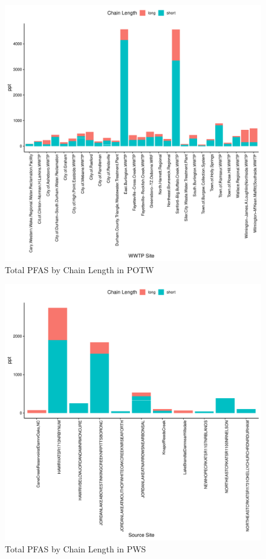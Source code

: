 \documentclass[
  12pt,
]{article}
\begin{document}
\begin{figure}

\includegraphics{PFAS_FinalProject_files/figure-latex/unnamed-chunk-21-1} \hfill{}

\caption{Total PFAS by Chain Length in POTW}\label{fig:unnamed-chunk-21}
\end{figure}

\begin{figure}

\includegraphics{PFAS_FinalProject_files/figure-latex/unnamed-chunk-22-1} \hfill{}

\caption{Total PFAS by Chain Length in PWS}\label{fig:unnamed-chunk-22}
\end{figure}
\end{document}
